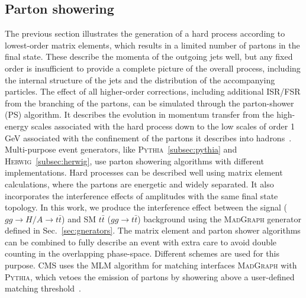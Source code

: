\subsection{Parton showering}
The previous section illustrates the generation of a hard process according to lowest-order matrix elements, which results in a limited number of partons in the final state. These describe the momenta of the outgoing jets well, but any fixed order is insufficient to provide a complete picture of the overall process, including the internal structure of the jets and the distribution of the accompanying particles. The effect of all higher-order corrections, including additional ISR/FSR from the branching of the partons, can be simulated through the parton-shower (PS) algorithm. It describes the evolution in momentum transfer from the high-energy scales associated with the hard process down to the low scales of order 1\,GeV associated with the confinement of the partons it describes into hadrons~\cite{parton_shower}. Multi-purpose event generators, like \textsc{Pythia}~\ref{subsec:pythia} and \textsc{Herwig}~\ref{subsec:herwig}, use parton showering algorithms with different implementations. Hard processes can be described well using matrix element calculations, where the partons are energetic and widely separated. It also incorporates the interference effects of amplitudes with the same final state topology. In this work, we produce the interference effect between the signal ($gg\rightarrow H/A\rightarrow t\bar{t}$) and SM $t\bar{t}$ ($gg\rightarrow t\bar{t}$) background using the \textsc{MadGraph} generator defined in Sec.~\ref{sec:gnerators}. The matrix element and parton shower algorithms can be combined to fully describe an event with extra care to avoid double counting in the overlapping phase-space. Different schemes are used for this purpose. CMS uses the MLM algorithm for matching interfaces \textsc{MadGraph} with \textsc{Pythia}, which vetoes the emission of partons by showering above a user-defined matching threshold~\cite{matching}.  
